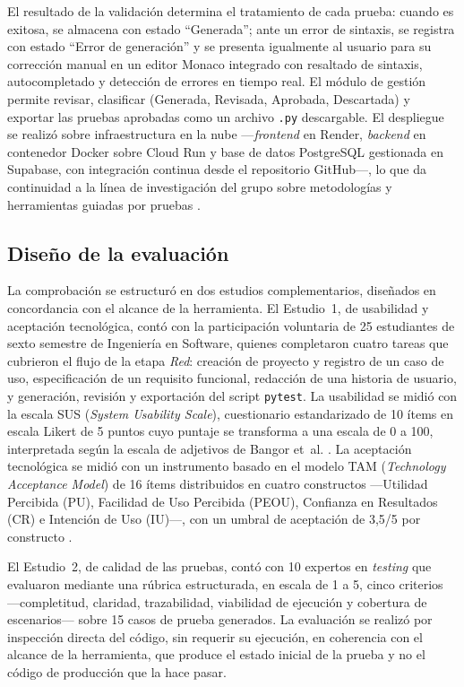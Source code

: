 \documentclass[10pt,journal,twoside,letterpaper]{IEEEtran}
\begin{document}
	El resultado de la validación determina el tratamiento de cada prueba: cuando es exitosa, se almacena con estado ``Generada''; ante un error de sintaxis, se registra con estado ``Error de generación'' y se presenta igualmente al usuario para su corrección manual en un editor Monaco integrado con resaltado de sintaxis, autocompletado y detección de errores en tiempo real. El módulo de gestión permite revisar, clasificar (Generada, Revisada, Aprobada, Descartada) y exportar las pruebas aprobadas como un archivo \texttt{.py} descargable. El despliegue se realizó sobre infraestructura en la nube ---\emph{frontend} en Render, \emph{backend} en contenedor Docker sobre Cloud Run y base de datos PostgreSQL gestionada en Supabase, con integración continua desde el repositorio GitHub---, lo que da continuidad a la línea de investigación del grupo sobre metodologías y herramientas guiadas por pruebas \cite{guerrero2020tddm4iots,guerrero2025tddtool,guerrero2023agile}.
	
	\subsection{Diseño de la evaluación}
	\label{subsec:validacion}
	
	La comprobación se estructuró en dos estudios complementarios, diseñados en concordancia con el alcance de la herramienta. El Estudio~1, de usabilidad y aceptación tecnológica, contó con la participación voluntaria de 25 estudiantes de sexto semestre de Ingeniería en Software, quienes completaron cuatro tareas que cubrieron el flujo de la etapa \emph{Red}: creación de proyecto y registro de un caso de uso, especificación de un requisito funcional, redacción de una historia de usuario, y generación, revisión y exportación del script \texttt{pytest}. La usabilidad se midió con la escala SUS (\emph{System Usability Scale}), cuestionario estandarizado de 10 ítems en escala Likert de 5 puntos cuyo puntaje se transforma a una escala de 0 a 100, interpretada según la escala de adjetivos de Bangor et~al. \cite{brooke1996sus,bangor2009sus}. La aceptación tecnológica se midió con un instrumento basado en el modelo TAM (\emph{Technology Acceptance Model}) de 16 ítems distribuidos en cuatro constructos ---Utilidad Percibida (PU), Facilidad de Uso Percibida (PEOU), Confianza en Resultados (CR) e Intención de Uso (IU)---, con un umbral de aceptación de 3,5/5 por constructo \cite{davis1989tam}.
	
	El Estudio~2, de calidad de las pruebas, contó con 10 expertos en \emph{testing} que evaluaron mediante una rúbrica estructurada, en escala de 1 a 5, cinco criterios ---completitud, claridad, trazabilidad, viabilidad de ejecución y cobertura de escenarios--- sobre 15 casos de prueba generados. La evaluación se realizó por inspección directa del código, sin requerir su ejecución, en coherencia con el alcance de la herramienta, que produce el estado inicial de la prueba y no el código de producción que la hace pasar.
	
\end{document}
